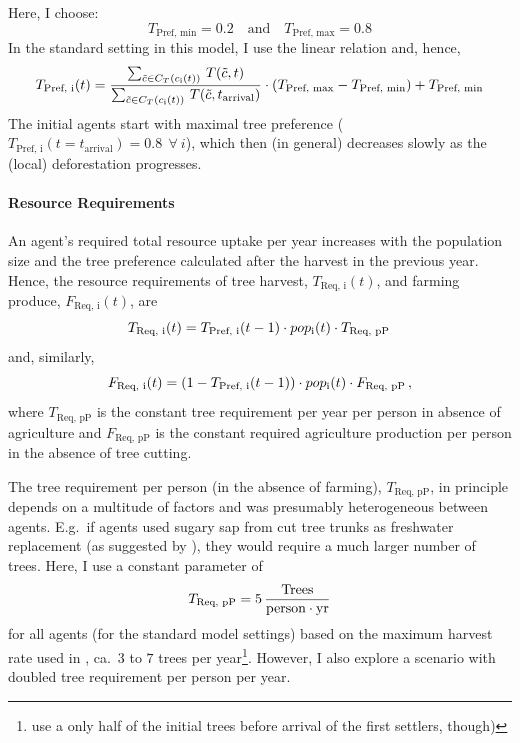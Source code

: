 Here, I choose: 
\begin{equation}
T_\text{Pref, min} = 0.2 \quad \text{and} \quad T_\text{Pref, max} = 0.8
\end{equation} 
In the standard setting in this model, I use the linear relation and, hence, 
\begin{equation}
	T_\text{Pref, i}(t) =  \frac{\sum_{\tilde{c} \in C_{T}(c_{\rm i}(t)) } \, T(\tilde{c}, t)}{\sum_{\tilde{c} \in C_{T}(c_{\rm i}(t))} \, T(\tilde{c}, t_\text{arrival}) } \cdot (T_\text{Pref, max}-T_\text{Pref, min}) + T_\text{Pref, min}
\end{equation}
The initial agents start with maximal tree preference ($T_\text{Pref, i}(t=t_\text{arrival}) = 0.8 \ \  \forall \ i$), which then (in general) decreases slowly as the (local) deforestation progresses.

\paragraph{Resource Requirements}
An agent's required total resource uptake per year increases with the population size and the tree preference calculated after the harvest in the previous year.
Hence, the resource requirements of tree harvest, $T_\text{Req, i}(t)$, and farming produce, $F_\text{Req, i}(t)$, are 
\begin{equation}
T_\text{Req, i}(t) = T_\text{Pref, i}(t-1) \cdot pop_{\rm i}(t) \cdot T_\text{Req, pP} \, 
\end{equation}
and, similarly, 
\begin{equation}
F_\text{Req, i}(t) = (1-T_\text{Pref, i}(t-1)) \cdot pop_{\rm i}(t) \cdot F_\text{Req, pP}\, , 
\end{equation}
where $T_\text{Req, pP}$ is the constant tree requirement per year per person in absence of agriculture and $F_\text{Req, pP}$ is the constant required agriculture production per person in the absence of tree cutting.

The tree requirement per person (in the absence of farming), $T_\text{Req, pP}$, in principle depends on a multitude of factors and was presumably heterogeneous between agents.
E.g.\ if agents used sugary sap from cut tree trunks as freshwater replacement (as suggested by \citet{Mieth2015}), they would require a much larger number of trees.
Here, I use a constant parameter of 
\begin{equation}
T_\text{Req, pP} = 5\, \frac{\text{Trees}}{\rm person\cdot yr}
\end{equation}
for all agents (for the standard model settings) based on the maximum harvest rate used in \citet{Brandt2015}, ca.\ $3$ to $7$ trees per year\footnote{\citet{Brandt2015} use a only half of the initial trees before arrival of the first settlers, though)}. 
However, I also explore a scenario with doubled tree requirement per person per year.

